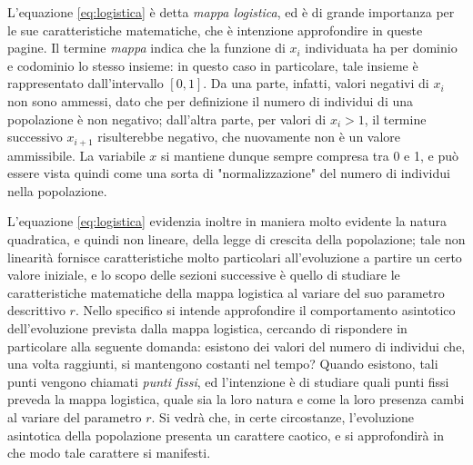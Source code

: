 L'equazione \ref{eq:logistica} è detta \textit{mappa logistica}, ed è di grande importanza per le sue caratteristiche matematiche, che è intenzione approfondire in queste pagine. Il termine \textit{mappa} indica che la funzione di $x_i$ individuata ha per dominio e codominio lo stesso insieme: in questo caso in particolare, tale insieme è rappresentato dall'intervallo $\left[0,1 \right]$. Da una parte, infatti, valori negativi di $x_i$ non sono ammessi, dato che per definizione il numero di individui di una popolazione è non negativo; dall'altra parte, per valori di $x_i > 1$, il termine successivo $x_{i+1}$ risulterebbe negativo, che nuovamente non è un valore ammissibile. La variabile $x$ si mantiene dunque sempre compresa tra 0 e 1, e può essere vista quindi come una sorta di "normalizzazione" del numero di individui nella popolazione.

L'equazione \ref{eq:logistica} evidenzia inoltre in maniera molto evidente la natura quadratica, e quindi non lineare, della legge di crescita della popolazione; tale non linearità fornisce caratteristiche molto particolari all'evoluzione a partire un certo valore iniziale, e lo scopo delle sezioni successive è quello di studiare le caratteristiche matematiche della mappa logistica al variare del suo parametro descrittivo $r$. Nello specifico si intende approfondire il comportamento asintotico dell'evoluzione prevista dalla mappa logistica, cercando di rispondere in particolare alla seguente domanda: esistono dei valori del numero di individui che, una volta raggiunti, si mantengono costanti nel tempo? Quando esistono, tali punti vengono chiamati \textit{punti fissi}, ed l'intenzione è di studiare quali punti fissi preveda la mappa logistica, quale sia la loro natura e come la loro presenza cambi al variare del parametro $r$. Si vedrà che, in certe circostanze, l'evoluzione asintotica della popolazione presenta un carattere caotico, e si approfondirà in che modo tale carattere si manifesti.
